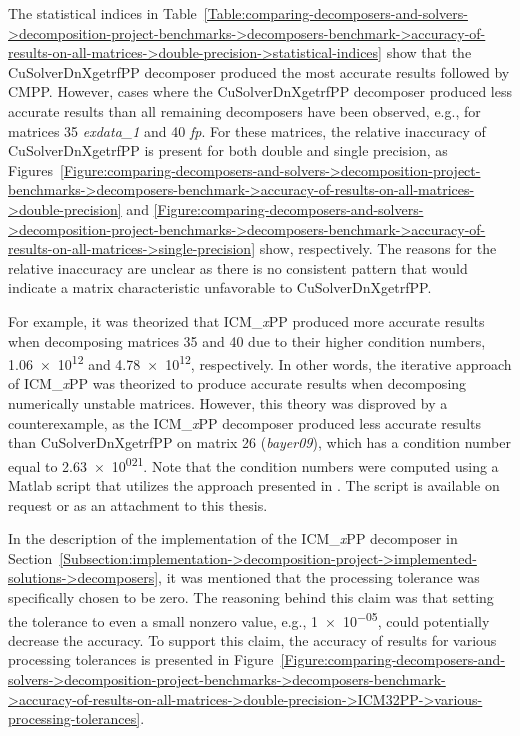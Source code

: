 The statistical indices in Table~\ref{Table:comparing-decomposers-and-solvers->decomposition-project-benchmarks->decomposers-benchmark->accuracy-of-results-on-all-matrices->double-precision->statistical-indices} show that the CuSolverDnXgetrfPP decomposer produced the most accurate results followed by CMPP.
However, cases where the CuSolverDnXgetrfPP decomposer produced less accurate results than all remaining decomposers have been observed, e.g., for matrices 35 \textit{exdata\_1} and 40 \textit{fp}.
For these matrices, the relative inaccuracy of CuSolverDnXgetrfPP is present for both double and single precision, as Figures~\ref{Figure:comparing-decomposers-and-solvers->decomposition-project-benchmarks->decomposers-benchmark->accuracy-of-results-on-all-matrices->double-precision} and \ref{Figure:comparing-decomposers-and-solvers->decomposition-project-benchmarks->decomposers-benchmark->accuracy-of-results-on-all-matrices->single-precision} show, respectively.
The reasons for the relative inaccuracy are unclear as there is no consistent pattern that would indicate a matrix characteristic unfavorable to CuSolverDnXgetrfPP.

For example, it was theorized that ICM\_\textit{x}PP produced more accurate results when decomposing matrices 35 and 40 due to their higher condition numbers, \num{1.06e+12} and \num{4.78e+12}, respectively.
In other words, the iterative approach of ICM\_\textit{x}PP was theorized to produce accurate results when decomposing numerically unstable matrices.
However, this theory was disproved by a counterexample, as the ICM\_\textit{x}PP decomposer produced less accurate results than CuSolverDnXgetrfPP on matrix 26 (\textit{bayer09}), which has a condition number equal to \num{2.63e+021}.
Note that the condition numbers were computed using a Matlab script that utilizes the approach presented in  \cite{Davis2010, Amestoy1996, Amestoy2004}.
The script is available on request or as an attachment to this thesis.

In the description of the implementation of the ICM\_\textit{x}PP decomposer in Section~\ref{Subsection:implementation->decomposition-project->implemented-solutions->decomposers}, it was mentioned that the processing tolerance was specifically chosen to be zero.
The reasoning behind this claim was that setting the tolerance to even a small nonzero value, e.g., \num{1e-05}, could potentially decrease the accuracy.
To support this claim, the accuracy of results for various processing tolerances is presented in Figure~\ref{Figure:comparing-decomposers-and-solvers->decomposition-project-benchmarks->decomposers-benchmark->accuracy-of-results-on-all-matrices->double-precision->ICM32PP->various-processing-tolerances}.

